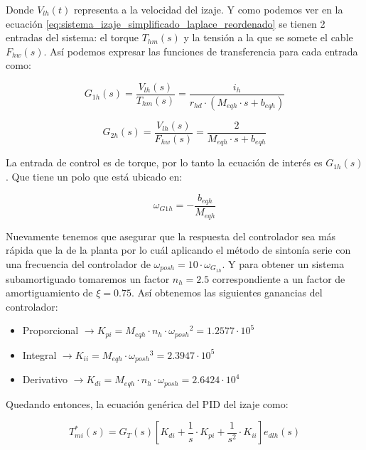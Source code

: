 \documentclass[11pt]{article}
\begin{document}
Donde $V_{lh}(t)$ representa a la velocidad del izaje. Y como podemos ver en la ecuación \ref{eq:sistema_izaje_simplificado_laplace_reordenado} se tienen 2 entradas del sistema: el torque $T_{hm}(s)$ y la tensión a la que se somete el cable $F_{hw}(s)$. Así podemos expresar las funciones de transferencia para cada entrada como:

\begin{equation}
	\label{eq:sistema_izaje_simplificado_laplace_G1h}
	G_{1h}(s)=\frac{V_{lh}(s)}{T_{hm}(s)}=\frac{i_{h}}{r_{hd}\cdot (M_{eqh}\cdot s+b_{eqh})}
\end{equation}

\begin{equation}
	\label{eq:sistema_izaje_simplificado_laplace_G2h}
	G_{2h}(s)=\frac{V_{lh}(s)}{F_{hw}(s)}=\frac{2}{M_{eqh}\cdot s+b_{eqh}}
\end{equation}

La entrada de control es de torque, por lo tanto la ecuación de interés es $G_{1h}(s)$. Que tiene un polo que está ubicado en:

\begin{equation}
	\label{eq:sistema_izaje_simplificado_laplace_polos}
	\omega_{G1h}=-\frac{b_{eqh}}{M_{eqh}}
\end{equation}

Nuevamente tenemos que asegurar que la respuesta del controlador sea más rápida que la de la planta por lo cuál aplicando el método de sintonía serie con una frecuencia del controlador de $\omega_{posh}=10\cdot \omega_{G_{1h}}$. Y para obtener un sistema subamortiguado tomaremos un factor $n_{h}=2.5$ correspondiente a un factor de amortiguamiento de $\xi =0.75$. Así obtenemos las siguientes ganancias del controlador:

\begin{itemize}
	\item Proporcional $\rightarrow K_{pi} = M_{eqh}\cdot n_{h}\cdot {\omega_{posh}}^{2} = 1.2577 \cdot 10^5$
	\item Integral $\rightarrow K_{ii} = M_{eqh}\cdot {\omega_{posh}}^{3}  = 2.3947 \cdot 10^5$
	\item Derivativo $\rightarrow K_{di} = M_{eqh}\cdot n_{h}\cdot {\omega_{posh}} = 2.6424\cdot 10^4$
\end{itemize}

Quedando entonces, la ecuación genérica del PID del izaje como:

\begin{equation}
	\label{eq:sistema_izaje_simplificado_laplace_controlador}
	T_{mi}^{*}(s)=G_{T}(s)\left [ K_{di}+\frac{1}{s}\cdot K_{pi}+\frac{1}{s^{2}}\cdot K_{ii} \right ] e_{dlh}(s)
\end{equation}
\end{document}
